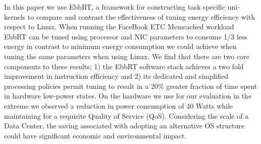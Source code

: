  In this paper we use EbbRT, a framework for constructing task specific uni-kernels to compare and contrast the effectiveness of tuning energy efficiency with respect to Linux.  When running the FaceBook ETC Memcached workload EbbRT can be tuned using processor and NIC parameters to consume 1/3 less energy in contrast to minimum energy consumption we could achieve when tuning the same parameters when using Linux.  We find that there are two core components to these results; 1) the EbbRT software stack achieves a two fold improvement in instruction efficiency and 2) its dedicated and simplified processing policies permit tuning to result in a 20\% greater fraction of time spent in hardware low-power states.  On the hardware we use for our evaluation in the extreme we observed a reduction in power consumption of 40 Watts while maintaining for a requisite Quality of Service (QoS).  Considering the scale of a Data Center, the saving associated with adopting 	an alternative OS structure could have significant economic and environmental impact.  
   
   
   
      


